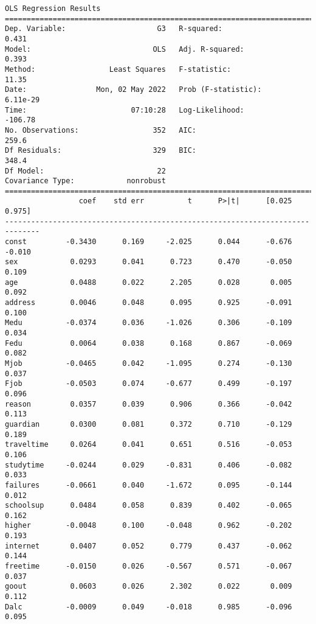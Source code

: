     \begin{Verbatim}[commandchars=\\\{\}]
                            OLS Regression Results
==============================================================================
Dep. Variable:                     G3   R-squared:                       0.431
Model:                            OLS   Adj. R-squared:                  0.393
Method:                 Least Squares   F-statistic:                     11.35
Date:                Mon, 02 May 2022   Prob (F-statistic):           6.11e-29
Time:                        07:10:28   Log-Likelihood:                -106.78
No. Observations:                 352   AIC:                             259.6
Df Residuals:                     329   BIC:                             348.4
Df Model:                          22
Covariance Type:            nonrobust
==============================================================================
                 coef    std err          t      P>|t|      [0.025      0.975]
------------------------------------------------------------------------------
const         -0.3430      0.169     -2.025      0.044      -0.676      -0.010
sex            0.0293      0.041      0.723      0.470      -0.050       0.109
age            0.0488      0.022      2.205      0.028       0.005       0.092
address        0.0046      0.048      0.095      0.925      -0.091       0.100
Medu          -0.0374      0.036     -1.026      0.306      -0.109       0.034
Fedu           0.0064      0.038      0.168      0.867      -0.069       0.082
Mjob          -0.0465      0.042     -1.095      0.274      -0.130       0.037
Fjob          -0.0503      0.074     -0.677      0.499      -0.197       0.096
reason         0.0357      0.039      0.906      0.366      -0.042       0.113
guardian       0.0300      0.081      0.372      0.710      -0.129       0.189
traveltime     0.0264      0.041      0.651      0.516      -0.053       0.106
studytime     -0.0244      0.029     -0.831      0.406      -0.082       0.033
failures      -0.0661      0.040     -1.672      0.095      -0.144       0.012
schoolsup      0.0484      0.058      0.839      0.402      -0.065       0.162
higher        -0.0048      0.100     -0.048      0.962      -0.202       0.193
internet       0.0407      0.052      0.779      0.437      -0.062       0.144
freetime      -0.0150      0.026     -0.567      0.571      -0.067       0.037
goout          0.0603      0.026      2.302      0.022       0.009       0.112
Dalc          -0.0009      0.049     -0.018      0.985      -0.096       0.095

\end{Verbatim}
